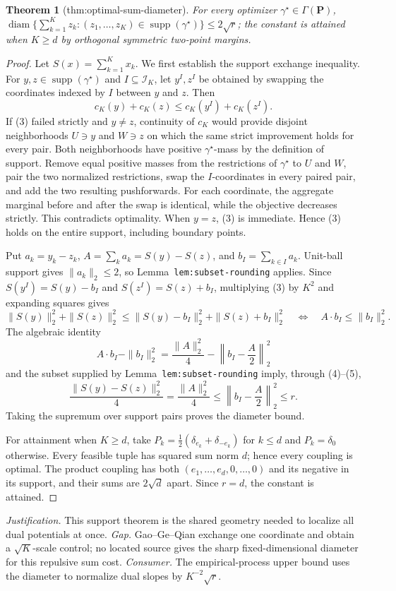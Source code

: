\documentclass{article}
\newtheorem{theorem}{Theorem}
\begin{document}
\begin{theorem}[thm:optimal-sum-diameter]\label{thm:optimal-sum-diameter}
For every optimizer \(\gamma^{\star}\in\Gamma(\mathbf P)\), \(\operatorname{diam}\{\sum_{k=1}^Kz_k:(z_1,\ldots,z_K)\in\operatorname{supp}(\gamma^{\star})\}\le2\sqrt r\); the constant is attained when \(K\ge d\) by orthogonal symmetric two-point margins.
\end{theorem}
\begin{proof}
Let \(S(x)=\sum_{k=1}^Kx_k\). We first establish the support exchange inequality. For \(y,z\in\operatorname{supp}(\gamma^\star)\) and \(I\subseteq\mathcal I_K\), let \(y^I,z^I\) be obtained by swapping the coordinates indexed by \(I\) between \(y\) and \(z\). Then
\[
c_K(y)+c_K(z)\le c_K(y^I)+c_K(z^I). \tag{3}
\]
If (3) failed strictly and \(y\ne z\), continuity of \(c_K\) would provide disjoint neighborhoods \(U\ni y\) and \(W\ni z\) on which the same strict improvement holds for every pair. Both neighborhoods have positive \(\gamma^\star\)-mass by the definition of support. Remove equal positive masses from the restrictions of \(\gamma^\star\) to \(U\) and \(W\), pair the two normalized restrictions, swap the \(I\)-coordinates in every paired pair, and add the two resulting pushforwards. For each coordinate, the aggregate marginal before and after the swap is identical, while the objective decreases strictly. This contradicts optimality. When \(y=z\), (3) is immediate. Hence (3) holds on the entire support, including boundary points.

Put \(a_k=y_k-z_k\), \(A=\sum_ka_k=S(y)-S(z)\), and \(b_I=\sum_{k\in I}a_k\). Unit-ball support gives \(\|a_k\|_2\le2\), so Lemma~\texttt{lem:subset-rounding} applies. Since \(S(y^I)=S(y)-b_I\) and \(S(z^I)=S(z)+b_I\), multiplying (3) by \(K^2\) and expanding squares gives
\[
\|S(y)\|_2^2+\|S(z)\|_2^2
\le\|S(y)-b_I\|_2^2+\|S(z)+b_I\|_2^2
\quad\Longleftrightarrow\quad
A\mathbin\cdot b_I\le\|b_I\|_2^2. \tag{4}
\]
The algebraic identity
\[
A\mathbin\cdot b_I-\|b_I\|_2^2
=\frac{\|A\|_2^2}{4}-\left\|b_I-\frac A2\right\|_2^2 \tag{5}
\]
and the subset supplied by Lemma~\texttt{lem:subset-rounding} imply, through (4)--(5),
\[
\frac{\|S(y)-S(z)\|_2^2}{4}=\frac{\|A\|_2^2}{4}
\le\left\|b_I-\frac A2\right\|_2^2\le r.
\]
Taking the supremum over support pairs proves the diameter bound.

For attainment when \(K\ge d\), take \(P_k=\tfrac12(\delta_{e_k}+\delta_{-e_k})\) for \(k\le d\) and \(P_k=\delta_0\) otherwise. Every feasible tuple has squared sum norm \(d\); hence every coupling is optimal. The product coupling has both \((e_1,\ldots,e_d,0,\ldots,0)\) and its negative in its support, and their sums are \(2\sqrt d\) apart. Since \(r=d\), the constant is attained.
\end{proof}
\par\smallskip\noindent \textit{Justification.} This support theorem is the shared geometry needed to localize all dual potentials at once. \textit{Gap.} Gao--Ge--Qian exchange one coordinate and obtain a \(\sqrt K\)-scale control; no located source gives the sharp fixed-dimensional diameter for this repulsive sum cost. \textit{Consumer.} The empirical-process upper bound uses the diameter to normalize dual slopes by \(K^{-2}\sqrt r\).
\end{document}
